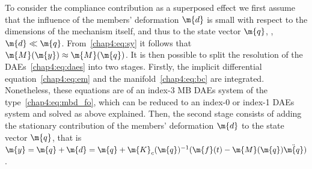 To consider the compliance contribution as a superposed effect we first assume that the influence of the members' deformation $\m{d}$ is small with respect to the dimensions of the mechanism itself, and thus to the state vector $\m{q}$, \ie{}, $\m{d} \ll \m{q}$. From~\eqref{chap4:eq:sy} it follows that $\m{M}(\m{y}) \approx \m{M}(\m{q})$. It is then possible to split the resolution of the \acp{DAE}~\eqref{chap4:eq:daes} into two stages. Firstly, the implicit differential equation~\eqref{chap4:eq:em} and the manifold~\eqref{chap4:eq:bc} are integrated. Nonetheless, these equations are of an index-3 \ac{MB} \acp{DAE} system of the type~\eqref{chap4:eq:mbd_fo}, which can be reduced to an index-0 or index-1 \acp{DAE} system and solved as above explained. Then, the second stage consists of adding the stationary contribution of the members' deformation $\m{d}$ to the state vector $\m{q}$, that is $\m{y} = \m{q} + \m{d} = \m{q} + \m{K}_c(\m{q})^{-1} (\m{f}(t) - \m{M}(\m{q})\ddot{\m{q}})$.


